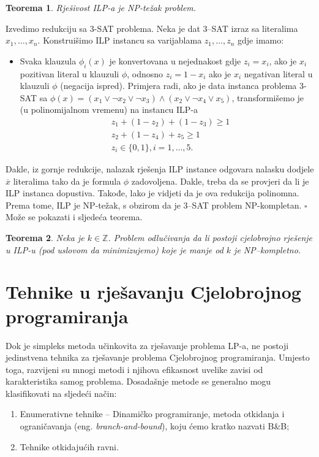 \documentclass[a4paper, utf8, 11pt, colorlinks]{book}
\newtheorem{thm}{Teorema}
\newenvironment{proof}{{Dokaz:}}{\hfill$\square$}
\begin{document}
   \begin{thm}
   	  Rješivost ILP-a je NP-težak problem.
   \end{thm}
   \begin{proof}
   	   Izvedimo redukciju sa 3-SAT problema. Neka je dat 3--SAT izraz sa literalima  
   	   $x_1,\ldots, x_n$.  Konstruišimo ILP instancu sa varijablama $z_1, \ldots, z_n$ gdje imamo:
   	   \begin{itemize}
   	   	   \item Svaka klauzula $\phi_i(x)$ je konvertovana u nejednakost gdje
   	   	      $z_i = x_i$, ako je $x_i$ pozitivan literal u klauzuli $\phi$, odnosno $z_i = 1 - x_i$ ako je $x_i$ negativan literal u klauzuli $\phi$ (negacija ispred). Primjera radi, ako je data instanca problema 3-SAT sa 
   	   	      $\phi(x) = (x_1 \vee \neg x_2 \vee \neg x_3) \wedge ( x_2 \vee \neg x_4 \vee x_5 )$, transformišemo je (u polinomijalnom vremenu) na instancu ILP-a
   	   	      \begin{align*}
   	   	         	 &z_1 + (1- z_2) + (1 - z_3 ) \geq 1 \\
   	   	         	 &z_2 + (1-z_4)  + z_5 \geq 1 \\
   	   	         	 & z_i \in \{0,1\}, i=1,\ldots,5.
   	   	      \end{align*} 
   	   \end{itemize}
   	   Dakle, iz gornje redukcije, nalazak rješenja ILP instance odgovara nalasku dodjele $\overline{x}$ literalima tako da je formula $\phi$ zadovoljena. Dakle, treba da se provjeri da li je ILP instanca dopustiva. Takođe, lako je vidjeti da je ova redukcija polinomna. Prema tome, ILP je NP-težak, s obzirom da je 3--SAT problem NP-kompletan. 
   \end{proof} \\
 Može se pokazati i sljedeća teorema.
 \begin{thm} Neka je $k\in \mathbb{Z}$.
 	 Problem odlučivanja da li postoji cjelobrojno rješenje u ILP-u (pod uslovom da minimizujemo) koje je manje od $k$ je NP--kompletno. 
 \end{thm}


 \chapter{Tehnike u rješavanju Cjelobrojnog programiranja}
 
 Dok je simpleks metoda učinkovita za rješavanje  problema LP-a, ne postoji jedinstvena tehnika za rješavanje problema Cjelobrojnog programiranja. Umjesto toga, razvijeni su mnogi metodi i njihova efikasnost
 uvelike zavisi od karakteristika samog problema. Dosadašnje metode se generalno mogu klasifikovati na sljedeći način:
 \begin{enumerate}
     \item Enumerativne tehnike -- Dinamičko programiranje, metoda otkidanja i ograničavanja (eng. \emph{branch-and-bound}), koju ćemo kratko nazvati B\&B;
     \item Tehnike otkidajućih ravni.
 \end{enumerate}
\end{document}
